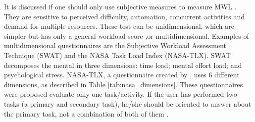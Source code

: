         It is discussed if one should only use subjective measures to measure MWL \cite{sanders1998human, stanton2004handbook}. They are sensitive to perceived difficulty, automation, concurrent activities and demand for multiple resources. These test can be unidimensional, which are simpler but has only a general workload score \cite{stanton2004handbook},or multidimensional. Examples of multidimensional questionnaires are the Subjective Workload Assessment Technique (SWAT) and the NASA Task Load Index (NASA-TLX). SWAT decomposes the mental in three dimensions: time load; mental effort load; and psychological stress. NASA-TLX, a questionnaire created by , uses 6 different dimensions, as described in Table \ref{tab:nasa_dimensions}. These questionnaires were proposed evaluate only one task/activity. If the user has performed two tasks (a primary and secondary task), he/she should be oriented to answer about the primary task, not a combination of both of them \cite{sanders1998human}.
        
